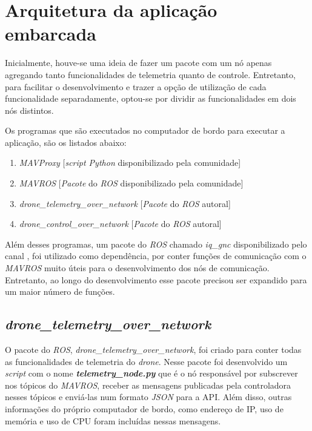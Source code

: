 \documentclass[12pt,a4paper,oneside]{book}
\begin{document}
\section{Arquitetura da aplicação embarcada}

Inicialmente, houve-se uma ideia de fazer um pacote com um nó apenas agregando tanto funcionalidades de telemetria quanto de controle. Entretanto, para facilitar o desenvolvimento e trazer a opção de utilização de cada funcionalidade separadamente, optou-se por dividir as funcionalidades em dois nós distintos.  

Os programas que são executados no computador de bordo para executar a aplicação, são os listados abaixo: 
\begin{enumerate}
  \item \textit{MAVProxy} [\textit{script Python} disponibilizado pela comunidade]
  \item \textit{MAVROS} [\textit{Pacote} do \textit{ROS} disponibilizado pela comunidade]
  \item \textit{drone\_telemetry\_over\_network} [\textit{Pacote} do \textit{ROS} autoral]
  \item \textit{drone\_control\_over\_network} [\textit{Pacote} do \textit{ROS} autoral]
\end{enumerate}

Além desses programas, um pacote do \textit{ROS} chamado \textit{iq\_gnc} disponibilizado pelo canal \cite{url:iq}, foi utilizado como dependência, por conter funções de comunicação com o \textit{MAVROS} muito úteis para o desenvolvimento dos nós de comunicação. Entretanto, ao longo do desenvolvimento esse pacote precisou ser expandido para um maior número de funções.

\subsection{\textit{drone\_telemetry\_over\_network}}

O pacote do \textit{ROS}, \textit{drone\_telemetry\_over\_network}, foi criado para conter todas as funcionalidades de telemetria do \textit{drone}. Nesse pacote foi desenvolvido um \textit{script} com o nome \textbf{\textit{telemetry\_node.py}} que é o nó responsável por subscrever nos tópicos do \textit{MAVROS}, receber as mensagens publicadas pela controladora nesses tópicos e enviá-las num formato \textit{JSON} para a API. Além disso, outras informações do próprio computador de bordo, como endereço de IP, uso de memória e uso de CPU foram incluídas nessas mensagens.
\end{document}
